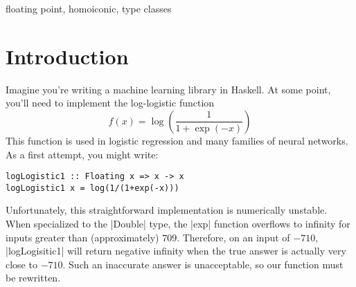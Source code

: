 \documentclass[preprint]{sigplanconf}
\theoremstyle{definition}
\begin{document}
\begin{abstract}
%

\end{abstract}



\keywords
floating point, homoiconic, type classes

\section{Introduction}

Imagine you're writing a machine learning library in Haskell.
At some point, you'll need to implement the log-logistic function
\begin{equation}
f(x) = \log\left(\frac{1}{1+\exp{(-x)}}\right)
\label{eq:log-logistic}
\end{equation}
This function is used in logistic regression and many families of neural networks.
As a first attempt, you might write:
\begin{lstlisting}
logLogistic1 :: Floating x => x -> x
logLogistic1 x = log(1/(1+exp(-x)))
\end{lstlisting}
Unfortunately, this straightforward implementation is numerically unstable.
When specialized to the |Double| type,
the |exp| function overflows to infinity for inputs greater than (approximately) $709$.
Therefore, on an input of $-710$,
|logLogisitic1| will return negative infinity when the true answer is actually very close to $-710$.
Such an inaccurate answer is unacceptable,
so our function must be rewritten.
\end{document}
